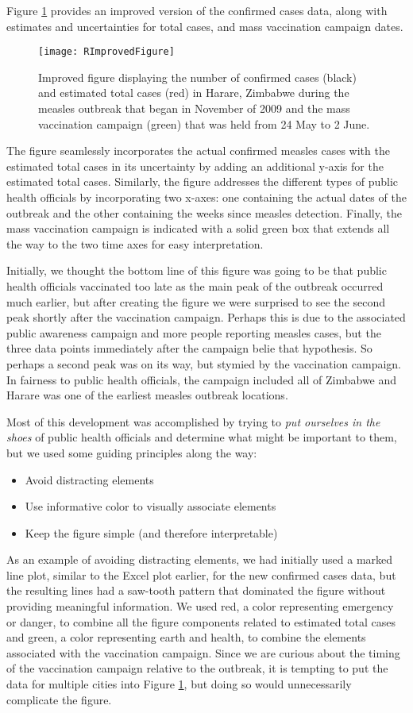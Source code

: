 \documentclass{article}
\begin{document}
Figure \ref{fig:RImprovedFigure} provides an improved version of the confirmed cases data, along with estimates and uncertainties for total cases, and mass vaccination campaign dates.
\begin{figure}[ht]
\centering
\texttt{[image: RImprovedFigure]}
\caption{Improved figure displaying the number of confirmed cases (black) and estimated total cases (red) in Harare, Zimbabwe during the measles outbreak that began in November of 2009 and the mass vaccination campaign (green) that was held from 24 May to 2 June.}
\label{fig:RImprovedFigure}
\end{figure}
The figure seamlessly incorporates the actual confirmed measles cases with the estimated total cases in its uncertainty by adding an additional y-axis for the estimated total cases. Similarly, the figure addresses the different types of public health officials by incorporating two x-axes: one containing the actual dates of the outbreak and the other containing the weeks since measles detection.  
Finally, the mass vaccination campaign is indicated with a solid green box that extends all the way to the two time axes for easy interpretation.

Initially, we thought the bottom line of this figure was going to be that public health officials vaccinated too late as the main peak of the outbreak occurred much earlier, but after creating the figure we were surprised to see the second peak shortly after the vaccination campaign. Perhaps this is due to the associated public awareness campaign and more people reporting measles cases, but the three data points immediately after the campaign belie that hypothesis. So perhaps a second peak was on its way, but stymied by the vaccination campaign. In fairness to public health officials, the campaign included all of Zimbabwe and Harare was one of the earliest measles outbreak locations. 

Most of this development was accomplished by trying to \emph{put ourselves in the shoes} of public health officials and determine what might be important to them, but we used some guiding principles along the way:
\begin{itemize}
\item Avoid distracting elements
\item Use informative color to visually associate elements
\item Keep the figure simple (and therefore interpretable)
\end{itemize}
As an example of avoiding distracting elements, we had initially used a marked line plot, similar to the Excel plot earlier, for the new confirmed cases data, but the resulting lines had a saw-tooth pattern that dominated the figure without providing meaningful information. We used red, a color representing emergency or danger, to combine all the figure components related to estimated total cases and green, a color representing earth and health, to combine the elements associated with the vaccination campaign. Since we are curious about the timing of the vaccination campaign relative to the outbreak, it is tempting to put the data for multiple cities into Figure  \ref{fig:RImprovedFigure}, but doing so would unnecessarily complicate the figure.
\end{document}
